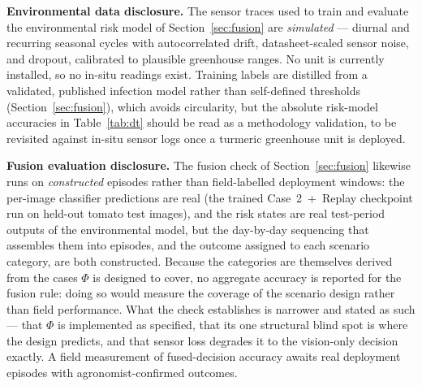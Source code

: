 \documentclass[journal]{IEEEtran}
\begin{document}
\textbf{Environmental data disclosure.} The sensor traces used to train and
evaluate the environmental risk model of Section~\ref{sec:fusion} are
\emph{simulated} --- diurnal and recurring seasonal cycles with autocorrelated
drift, datasheet-scaled sensor noise, and dropout, calibrated to plausible
greenhouse ranges. No unit is currently installed, so no in-situ readings exist.
Training labels are distilled from a validated, published infection model rather
than self-defined thresholds (Section~\ref{sec:fusion}), which avoids circularity,
but the absolute risk-model accuracies in Table~\ref{tab:dt} should be read as a
methodology validation, to be revisited against in-situ sensor logs once a turmeric
greenhouse unit is deployed.

\textbf{Fusion evaluation disclosure.} The fusion check of
Section~\ref{sec:fusion} likewise runs on \emph{constructed} episodes rather than
field-labelled deployment windows: the per-image classifier predictions are real
(the trained Case~2~+~Replay checkpoint run on held-out tomato test images), and the
risk states are real test-period outputs of the environmental model, but the
day-by-day sequencing that assembles them into episodes, and the outcome assigned to
each scenario category, are both constructed. Because the categories are themselves
derived from the cases $\Phi$ is designed to cover, no aggregate accuracy is reported
for the fusion rule: doing so would measure the coverage of the scenario design
rather than field performance. What the check establishes is narrower and stated as
such --- that $\Phi$ is implemented as specified, that its one structural blind spot
is where the design predicts, and that sensor loss degrades it to the vision-only
decision exactly. A field measurement of fused-decision accuracy awaits real
deployment episodes with agronomist-confirmed outcomes.
\end{document}
